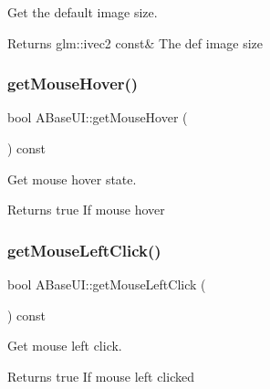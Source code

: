 Get the default image size. 

\begin{DoxyReturn}{Returns}
glm\+::ivec2 const\& The def image size 
\end{DoxyReturn}
\mbox{\label{class_a_base_u_i_a0fcf09799934ef6d86a62b266020757a}} 
\subsubsection{\texorpdfstring{get\+Mouse\+Hover()}{getMouseHover()}}
{\footnotesize\ttfamily bool A\+Base\+U\+I\+::get\+Mouse\+Hover (\begin{DoxyParamCaption}{ }\end{DoxyParamCaption}) const\hspace{0.3cm}{\ttfamily [virtual]}}



Get mouse hover state. 

\begin{DoxyReturn}{Returns}
true If mouse hover 
\end{DoxyReturn}
\mbox{\label{class_a_base_u_i_a551e7a67ca99714da946f23b42ee1e28}} 
\subsubsection{\texorpdfstring{get\+Mouse\+Left\+Click()}{getMouseLeftClick()}}
{\footnotesize\ttfamily bool A\+Base\+U\+I\+::get\+Mouse\+Left\+Click (\begin{DoxyParamCaption}{ }\end{DoxyParamCaption}) const\hspace{0.3cm}{\ttfamily [virtual]}}



Get mouse left click. 

\begin{DoxyReturn}{Returns}
true If mouse left clicked 
\end{DoxyReturn}
\mbox{\label{class_a_base_u_i_aaf2a90f2fd6bab0439b5437c7c0b1d27}} 
